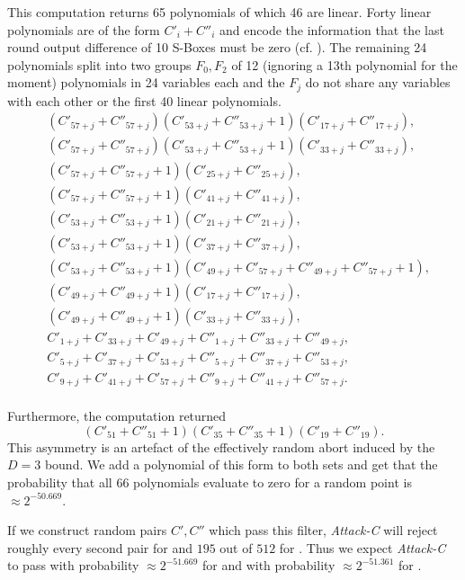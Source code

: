 This computation returns 65 polynomials of which 46 are linear. Forty linear polynomials are of the form $C'_{i} + C''_{i}$ and encode the information that the last round output difference of 10 S-Boxes must be zero (cf. \cite{present-dc:africacrypt}). The remaining 24 polynomials split into two groups $F_0,F_2$ of 12 (ignoring a 13th polynomial for the moment) polynomials in 24 variables each and the $F_j$ do not share any variables with each other or the first 40 linear polynomials.
\begin{align*}
& (C'_{57+j} + C''_{57+j})    (C'_{53+j} + C''_{53+j} + 1)(C'_{17+j} + C''_{17+j}),\\
& (C'_{57+j} + C''_{57+j})    (C'_{53+j} + C''_{53+j} + 1)(C'_{33+j} + C''_{33+j}),\\
& (C'_{57+j} + C''_{57+j} + 1)(C'_{25+j} + C''_{25+j}),\\
& (C'_{57+j} + C''_{57+j} + 1)(C'_{41+j} + C''_{41+j}),\\
& (C'_{53+j} + C''_{53+j} + 1)(C'_{21+j} + C''_{21+j}),\\
& (C'_{53+j} + C''_{53+j} + 1)(C'_{37+j} + C''_{37+j}),\\
& (C'_{53+j} + C''_{53+j} + 1)(C'_{49+j} + C'_{57+j} + C''_{49+j} + C''_{57+j} + 1),\\
& (C'_{49+j} + C''_{49+j} + 1)(C'_{17+j} + C''_{17+j}),\\
& (C'_{49+j} + C''_{49+j} + 1)(C'_{33+j} + C''_{33+j}),\\
& C'_{ 1+j} + C'_{33+j} + C'_{49+j} + C''_{ 1+j} + C''_{33+j} + C''_{49+j},\\
& C'_{ 5+j} + C'_{37+j} + C'_{53+j} + C''_{ 5+j} + C''_{37+j} + C''_{53+j},\\
& C'_{ 9+j} + C'_{41+j} + C'_{57+j} + C''_{ 9+j} + C''_{41+j} + C''_{57+j}.\\
\end{align*}

Furthermore, the computation returned $$(C'_{51} + C''_{51} + 1)(C'_{35} + C''_{35} + 1)(C'_{19} + C''_{19}).$$
This asymmetry is an artefact of the effectively random abort induced by the $D=3$ bound. We add a polynomial of this form to both sets and
get that the probability that all 66 polynomials evaluate to zero for a random point is $\approx 2^{-50.669}$. 

If we construct random pairs $C',C''$ which pass this filter, \emph{Attack-C} will reject roughly every second pair for  and $195$ out of $512$ for . Thus we expect \emph{Attack-C} to pass with probability $\approx 2^{-51.669}$  for  and with probability $\approx 2^{-51.361}$ for .

